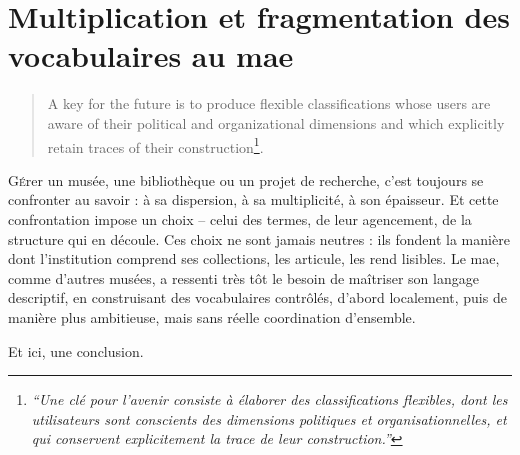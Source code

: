 \chapter[Les vocabulaires contrôlés au \ac{mae}]{\label{II-A} Multiplication et fragmentation des vocabulaires au \ac{mae}}

\begin{quote}
	\og A key for the future is to produce flexible classifications whose users are aware of their political and organizational dimensions and which explicitly retain traces of their construction\footnote{\textit{\enquote{Une clé pour l’avenir consiste à élaborer des classifications flexibles, dont les utilisateurs sont conscients des dimensions politiques et organisationnelles, et qui conservent explicitement la trace de leur construction.}}\cite{bowkerArrangerChosesConsequences2023}}.\fg
\end{quote}

\lettrine{G}érer un musée, une bibliothèque ou un projet de recherche, c’est toujours se confronter au savoir : à sa dispersion, à sa multiplicité, à son épaisseur. Et cette confrontation impose un choix – celui des termes, de leur agencement, de la structure qui en découle. Ces choix ne sont jamais neutres : ils fondent la manière dont l’institution comprend ses collections, les articule, les rend lisibles. Le \ac{mae}, comme d’autres musées, a ressenti très tôt le besoin de maîtriser son langage descriptif, en construisant des vocabulaires contrôlés, d’abord localement, puis de manière plus ambitieuse, mais sans réelle coordination d’ensemble.






\bigskip
\bigskip
\bigskip

Et ici, une conclusion.